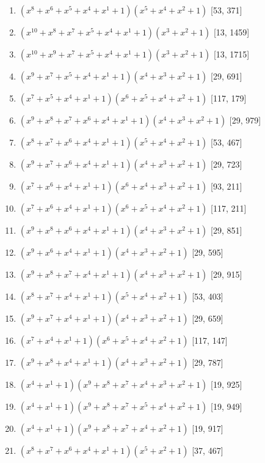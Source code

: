\documentclass[10pt,twocolumn]{article}
\begin{document}
\begin{enumerate}
\item $(x^{8} + x^{6} + x^{5} + x^{4} + x^{1} + 1)(x^{5} + x^{4} + x^{2} + 1)$  [53, 371]
\item $(x^{10} + x^{8} + x^{7} + x^{5} + x^{4} + x^{1} + 1)(x^{3} + x^{2} + 1)$  [13, 1459]
\item $(x^{10} + x^{9} + x^{7} + x^{5} + x^{4} + x^{1} + 1)(x^{3} + x^{2} + 1)$  [13, 1715]
\item $(x^{9} + x^{7} + x^{5} + x^{4} + x^{1} + 1)(x^{4} + x^{3} + x^{2} + 1)$  [29, 691]
\item $(x^{7} + x^{5} + x^{4} + x^{1} + 1)(x^{6} + x^{5} + x^{4} + x^{2} + 1)$  [117, 179]
\item $(x^{9} + x^{8} + x^{7} + x^{6} + x^{4} + x^{1} + 1)(x^{4} + x^{3} + x^{2} + 1)$  [29, 979]
\item $(x^{8} + x^{7} + x^{6} + x^{4} + x^{1} + 1)(x^{5} + x^{4} + x^{2} + 1)$  [53, 467]
\item $(x^{9} + x^{7} + x^{6} + x^{4} + x^{1} + 1)(x^{4} + x^{3} + x^{2} + 1)$  [29, 723]
\item $(x^{7} + x^{6} + x^{4} + x^{1} + 1)(x^{6} + x^{4} + x^{3} + x^{2} + 1)$  [93, 211]
\item $(x^{7} + x^{6} + x^{4} + x^{1} + 1)(x^{6} + x^{5} + x^{4} + x^{2} + 1)$  [117, 211]
\item $(x^{9} + x^{8} + x^{6} + x^{4} + x^{1} + 1)(x^{4} + x^{3} + x^{2} + 1)$  [29, 851]
\item $(x^{9} + x^{6} + x^{4} + x^{1} + 1)(x^{4} + x^{3} + x^{2} + 1)$  [29, 595]
\item $(x^{9} + x^{8} + x^{7} + x^{4} + x^{1} + 1)(x^{4} + x^{3} + x^{2} + 1)$  [29, 915]
\item $(x^{8} + x^{7} + x^{4} + x^{1} + 1)(x^{5} + x^{4} + x^{2} + 1)$  [53, 403]
\item $(x^{9} + x^{7} + x^{4} + x^{1} + 1)(x^{4} + x^{3} + x^{2} + 1)$  [29, 659]
\item $(x^{7} + x^{4} + x^{1} + 1)(x^{6} + x^{5} + x^{4} + x^{2} + 1)$  [117, 147]
\item $(x^{9} + x^{8} + x^{4} + x^{1} + 1)(x^{4} + x^{3} + x^{2} + 1)$  [29, 787]
\item $(x^{4} + x^{1} + 1)(x^{9} + x^{8} + x^{7} + x^{4} + x^{3} + x^{2} + 1)$  [19, 925]
\item $(x^{4} + x^{1} + 1)(x^{9} + x^{8} + x^{7} + x^{5} + x^{4} + x^{2} + 1)$  [19, 949]
\item $(x^{4} + x^{1} + 1)(x^{9} + x^{8} + x^{7} + x^{4} + x^{2} + 1)$  [19, 917]
\item $(x^{8} + x^{7} + x^{6} + x^{4} + x^{1} + 1)(x^{5} + x^{2} + 1)$  [37, 467]

\end{enumerate}
\end{document}

